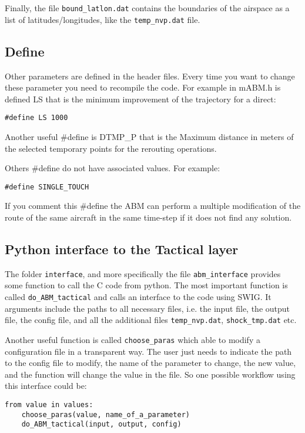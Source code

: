 \documentclass[12pt]{article}
\begin{document}
Finally, the file \verb|bound_latlon.dat| contains the boundaries of the airspace as a list of latitudes/longitudes, like the \verb|temp_nvp.dat| file.

\subsection{Define}

Other parameters are defined in the header files. Every time you want to change these parameter you need to recompile the code. For example in mABM.h is defined LS that is the minimum improvement of the trajectory for a direct:
\begin{verbatim}
#define LS 1000
\end{verbatim}

Another useful \#define is DTMP\_P that is the Maximum distance in meters of the selected temporary points for the rerouting operations.

Others \#define do not have associated values. For example:
\begin{verbatim}
#define SINGLE_TOUCH
\end{verbatim}

If you comment this \#define the ABM can perform a multiple modification of the route of the same aircraft in the same time-step if it does not find any solution.

\subsection{Python interface to the Tactical layer}
\label{subsec:interface}

The folder \verb|interface|, and more specifically the file \verb|abm_interface| provides some function to call the C code from python. The most important function is called \verb|do_ABM_tactical| and calls an interface to the code using SWIG. It arguments include the paths to all necessary files, i.e. the input file, the output file, the config file, and all the additional files \verb|temp_nvp.dat|, \verb|shock_tmp.dat| etc.

Another useful function is called \verb|choose_paras| which able to modify a configuration file in a transparent way. The user just needs to indicate the path to the config file to modify, the name of the parameter to change, the new value, and the function will change the value in the file. So one possible workflow using this interface could be:

\begin{verbatim}
from value in values:
    choose_paras(value, name_of_a_parameter)
    do_ABM_tactical(input, output, config)
\end{verbatim} 
\end{document}
